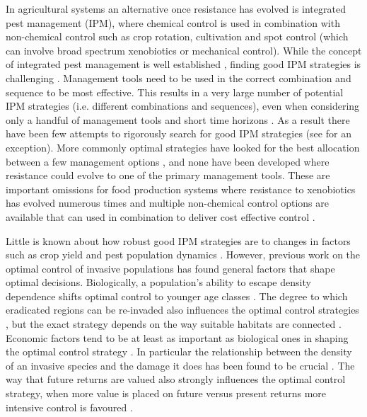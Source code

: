 \documentclass[12pt, a4paper]{article}
\begin{document}
In agricultural systems an alternative once resistance has evolved is integrated pest management (IPM), where chemical control is used in combination with non-chemical control such as crop rotation, cultivation and spot control (which can involve broad spectrum xenobiotics or mechanical control). While the concept of integrated pest management is well established \citep{Bott1979}, finding good IPM strategies is challenging \citep{Dana2014, Chal2015}. Management tools need to be used in the correct combination and sequence to be most effective. This results in a very large number of potential IPM strategies (i.e. different combinations and sequences), even when considering only a handful of management tools and short time horizons \citep{Chal2015}. As a result there have been few attempts to rigorously search for good IPM strategies (see \citealt{Chal2015} for an exception). More commonly optimal strategies have looked for the best allocation between a few management options \citep{EpanN2010, Meis2016, Okum2016, Buyu2017}, and none have been developed where resistance could evolve to one of the primary management tools. These are important omissions for food production systems where resistance to xenobiotics has evolved numerous times \citep{Denh1992, Palu2001} and multiple non-chemical control options are available that can used in combination to deliver cost effective control \citep{Chal2015}.      

Little is known about how robust good IPM strategies are to changes in factors such as crop yield and pest population dynamics \citep{EpanN2010}. However, previous work on the optimal control of invasive populations has found general factors that shape optimal decisions. Biologically, a population's ability to escape density dependence shifts optimal control to younger age classes \citep{Pich2012}. The degree to which eradicated regions can be re-invaded also influences the optimal control strategies \citep{Janu2011, EpaN2012}, but the exact strategy depends on the way suitable habitats are connected \citep{Chads2011}. Economic factors tend to be at least as important as biological ones in shaping the optimal control strategy \citep{EpanN2010}. In particular the relationship between the density of an invasive species and the damage it does has been found to be crucial \citep{Yoko2009}. The way that future returns are valued also strongly influences the optimal control strategy, when more value is placed on future versus present returns more intensive control is favoured \citep{EpanN2010}.
\end{document}
